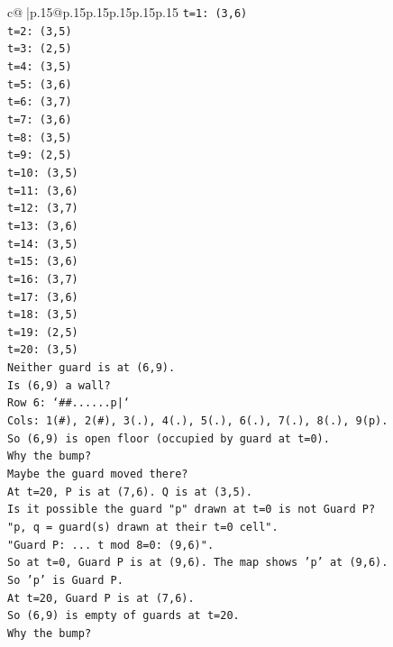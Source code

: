 \documentclass{article}
\begin{document}
{\begin{supertabular}{c@{$\;$}|p{.15\linewidth}@{}p{.15\linewidth}p{.15\linewidth}p{.15\linewidth}p{.15\linewidth}p{.15\linewidth}}
{{{\texttt{t=1: (3,6)} \\
\texttt{t=2: (3,5)} \\
\texttt{t=3: (2,5)} \\
\texttt{t=4: (3,5)} \\
\texttt{t=5: (3,6)} \\
\texttt{t=6: (3,7)} \\
\texttt{t=7: (3,6)} \\
\texttt{t=8: (3,5)} \\
\texttt{t=9: (2,5)} \\
\texttt{t=10: (3,5)} \\
\texttt{t=11: (3,6)} \\
\texttt{t=12: (3,7)} \\
\texttt{t=13: (3,6)} \\
\texttt{t=14: (3,5)} \\
\texttt{t=15: (3,6)} \\
\texttt{t=16: (3,7)} \\
\texttt{t=17: (3,6)} \\
\texttt{t=18: (3,5)} \\
\texttt{t=19: (2,5)} \\
\texttt{t=20: (3,5)} \\
\texttt{Neither guard is at (6,9).} \\
\texttt{Is (6,9) a wall?} \\
\texttt{Row 6: `\#\#......p|`} \\
\texttt{Cols: 1(\#), 2(\#), 3(.), 4(.), 5(.), 6(.), 7(.), 8(.), 9(p).} \\
\texttt{So (6,9) is open floor (occupied by guard at t=0).} \\
\texttt{Why the bump?} \\
\texttt{Maybe the guard moved there?} \\
\texttt{At t=20, P is at (7,6). Q is at (3,5).} \\
\texttt{Is it possible the guard "p" drawn at t=0 is not Guard P?} \\
\texttt{"p, q = guard(s) drawn at their t=0 cell".} \\
\texttt{"Guard P: ... t mod 8=0: (9,6)".} \\
\texttt{So at t=0, Guard P is at (9,6). The map shows 'p' at (9,6).} \\
\texttt{So 'p' is Guard P.} \\
\texttt{At t=20, Guard P is at (7,6).} \\
\texttt{So (6,9) is empty of guards at t=20.} \\
\texttt{Why the bump?} \\
}}}
\end{supertabular}}
\end{document}
